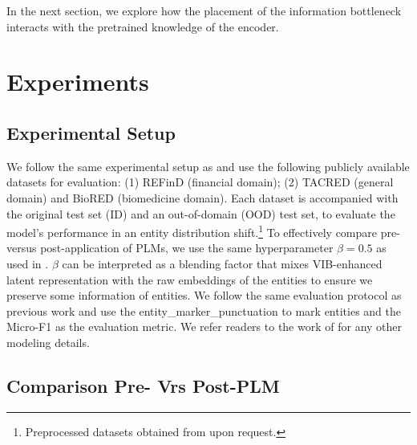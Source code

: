\documentclass[11pt]{article}
\begin{document}
In the next section, we explore how the placement of the information bottleneck interacts with the pretrained knowledge of the encoder.

\section{Experiments}
\subsection{Experimental Setup}
We follow the same experimental setup as \cite{} and use the following publicly available datasets for evaluation: (1) REFinD \cite{} (financial domain); (2) TACRED \cite{} (general domain) and BioRED \cite{} (biomedicine domain). Each dataset is accompanied with the original test set (ID) and an out-of-domain (OOD) test set, to evaluate the model's performance in an entity distribution shift.\footnote{Preprocessed datasets obtained from \cite{} upon request.} To effectively compare pre- versus post-application of PLMs, we use the same hyperparameter $\beta=0.5$ as used in \cite{}. $\beta$ can be interpreted as a blending factor that mixes VIB-enhanced latent representation with the raw embeddings of the entities to ensure we preserve some information of entities. We follow the same evaluation protocol as previous work \cite{} and use the entity\_marker\_punctuation \cite{} to mark entities and the Micro-F1 as the evaluation metric. We refer readers to the work of \cite{} for any other modeling details. 

\subsection{Comparison Pre- Vrs Post-PLM}
\end{document}
